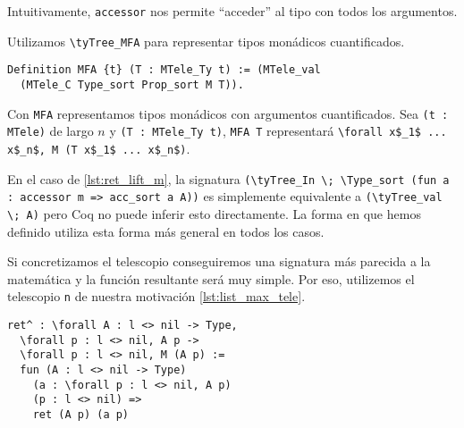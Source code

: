 
Intuitivamente, \lstinline{accessor} nos permite ``acceder'' al tipo con todos los argumentos.

Utilizamos \lstinline{\tyTree_MFA} para representar tipos monádicos cuantificados. %

\begin{lstlisting}[frame=tb,caption={Definición de \lstinline{MFA}},label=lst:mfa]
Definition MFA {t} (T : MTele_Ty t) := (MTele_val
  (MTele_C Type_sort Prop_sort M T)).
\end{lstlisting}

Con \lstinline{MFA} representamos tipos monádicos con argumentos cuantificados. 
Sea \lstinline{(t : MTele)} de largo $n$ y \lstinline{(T : MTele_Ty t)}, \lstinline{MFA T} representará \lstinline{\forall x$_1$ ... x$_n$, M (T x$_1$ ... x$_n$)}.

En el caso de \ref{lst:ret_lift_m}, la signatura \lstinline{(\tyTree_In \; \Type_sort (fun a : accessor m => acc_sort a A))} es simplemente equivalente a \lstinline{(\tyTree_val \; A)} pero Coq no puede inferir esto directamente.
La forma en que hemos definido \lift utiliza esta forma más general en todos los casos.

Si concretizamos el telescopio conseguiremos una signatura más parecida a la matemática y la función resultante será muy simple. Por eso, utilizemos el telescopio \lstinline{n} de nuestra motivación \ref{lst:list_max_tele}.

\begin{lstlisting}[frame=tb,caption={Ejemplo de \lstinline{ret^}},label=lst:exmp_ret]
ret^ : \forall A : l <> nil -> Type,
  \forall p : l <> nil, A p ->
  \forall p : l <> nil, M (A p) :=
  fun (A : l <> nil -> Type)
    (a : \forall p : l <> nil, A p)
    (p : l <> nil) => 
    ret (A p) (a p)
\end{lstlisting}

